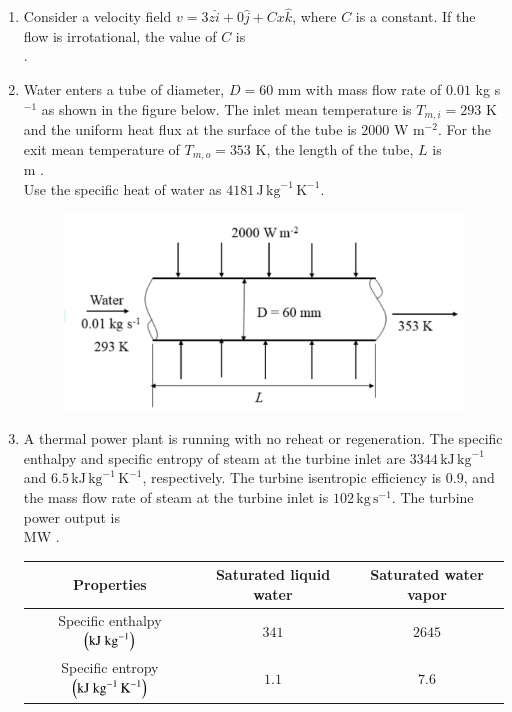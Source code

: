 \documentclass[journal]{IEEEtran}
\begin{document}
\begin{enumerate}[leftmargin=0pt]
\item
Consider a velocity field $v = 3z \hat{i} + 0 \hat{j} + Cx \hat{k}$, where $C$ is a constant. If the flow is irrotational, the value of $C$ is\\
\underline{\hspace{2cm}} .

\hfill{}

\item
Water enters a tube of diameter, $D = 60$ mm with mass flow rate of $0.01$ kg s$^{-1}$ as shown in the figure below. The inlet mean temperature is $T_{m,i} = 293$ K and the uniform heat flux at the surface of the tube is $2000$ W m$^{-2}$. For the exit mean temperature of $T_{m,o}= 353$ K, the length of the tube, $L$ is\\
\underline{\hspace{2cm}} m .\\
Use the specific heat of water as $4181\,\text{J}\,\text{kg}^{-1}\,\text{K}^{-1}$.
\begin{figure}[H]\includegraphics[width=0.5\columnwidth]{Figs/image - 2025-08-24T170258.389.png}\caption*{}\label{fig:q51}\end{figure}
\hfill{}

\item
A thermal power plant is running with no reheat or regeneration. The specific enthalpy and specific entropy of steam at the turbine inlet are $3344\,\text{kJ}\,\text{kg}^{-1}$ and $6.5\,\text{kJ}\,\text{kg}^{-1}\,\text{K}^{-1}$, respectively. The turbine isentropic efficiency is $0.9$, and the mass flow rate of steam at the turbine inlet is $102\,\text{kg}\,\text{s}^{-1}$. The turbine power output is\\
\underline{\hspace{2cm}} MW .

\begin{tabular}{|c|c|c|}
\hline
Properties & Saturated liquid water & Saturated water vapor\\
\hline
Specific enthalpy $\left(\text{kJ kg}^{-1}\right)$ & $341$ & $2645$\\
\hline
Specific entropy $\left(\text{kJ kg}^{-1}\,\text{K}^{-1}\right)$ & $1.1$ & $7.6$\\
\hline
\end{tabular}



\end{enumerate}
\end{document}
